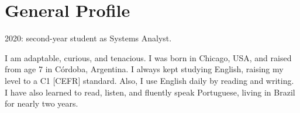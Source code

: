 \section{General Profile} %

2020: second-year student as Systems Analyst.

I am adaptable, curious, and tenacious. 
I was born in Chicago, USA, and raised from age 7 in Córdoba, Argentina. 
I always kept studying English, raising my level to a C1 [CEFR] standard.
Also, I use English daily by reading and writing. 
I have also learned to read, listen, and fluently speak Portuguese, living in Brazil for nearly two years.

